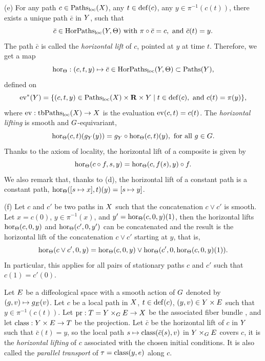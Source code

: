 \begin{article}
  (e) For any path $c \in \operatorname{Paths}_{\mathrm{loc}}(X)$,
  any $t \in \mathrm{def}(c)$,
  any $y \in \pi^{-1}(c(t))$,
  there exists a unique path $\bar c$ in $Y$,
  such that
  $$%
  \bar c \in \HorPaths_\loc(\Y, \Theta)\text{ with } \pi \circ \bar c = c, \text{ and } \bar c(t) = y.
  $$%
  The path $\bar c$ is called the {\em horizontal lift} of $c$,
  pointed at $y$ at time $t$.
  Therefore, we get a map
  \begin{equation}
    \renewcommand{\theequation}{$\clubsuit$}
    \hor_\Theta : (c,t,y) \mapsto \bar c \in \HorPaths_\loc(\Y,\Theta) \subset \Paths(\Y),
  \end{equation}
  defined on
  $$%
  \ev^*(\Y) = \{ (c,t,y) \in \Paths_\loc(\X) \times \RR \times \Y \mid t \in \Dom(c), \text{ and } c(t) = \pi(y) \},
  $$%
  where ${\operatorname{ev}} : \operatorname{tbPaths}_{\mathrm{loc}}(X) \to X$ is the evaluation ${\operatorname{ev}}(c,t) = c(t)$.
  The {\em horizontal lifting} is smooth and $G$-equivariant,
  $$%
  \hor_\Theta(c,t)(g_\Y(y)) = g_\Y \circ \hor_\Theta(c,t)(y), \text{ for all } g \in \G.
  $$%
  Thanks to the axiom of locality,
  the horizontal lift of a composite is given by
  $$%
  \hor_\Theta(c \circ f, s, y) = \hor_\Theta(c, f(s),y)\circ f.
  $$%
  We also remark that,
  thanks to (d),
  the horizontal lift of a constant path is a constant path,
  $\operatorname{hor}_\Theta([s \mapsto x],t)(y) = [s \mapsto y]$.
  
  (f) Let $c$ and $c'$ be two paths in $X$ such that the concatenation $c\vee c'$  is smooth.
  Let $x = c(0)$,
  $y \in \pi^{-1}(x)$,
  and $y' = \operatorname{hor}_\Theta(c,0,y)(1)$,
  then the horizontal lifts $\operatorname{hor}_\Theta(c,0,y)$ and $\operatorname{hor}_\Theta(c',0,y')$ can be concatenated and the result is the horizontal lift of the concatenation $c \vee c'$ starting at $y$,
  that is,
  $$%
  \hor_\Theta(c \vee c',0,y) =  \hor_\Theta(c,0,y) \vee \hor_\Theta(c',0, \hor_\Theta(c,0,y)(1)).
  $$%
  In particular, this applies for all pairs of stationary paths $c$ and $c'$  such
  that $c(1) = c'(0)$.
  
   Let $E$ be a diffeological space with a smooth action of $G$ denoted by $(g,v) \mapsto g_E(v)$.
  Let $c$ be a local path in $X$, $t \in \mathrm{def}(c)$,
  $(y,v) \in Y \times E$ such that $y \in \pi^{-1}(c(t))$.
  Let $\mathrm{pr} : T = Y \times_G E \to X$ be the associated fiber bundle ,
  and let $\operatorname{class} : Y \times E \to T$ be the projection.
  Let $\bar c$ be the horizontal lift of $c$ in $Y$ such that $\bar c(t) = y$,
  so the local path $s \mapsto \operatorname{class}(\bar c(s),v)$ in $Y \times_G E$ covers $c$,
  it is the {\em horizontal lifting} of $c$ associated with the chosen initial conditions.
  It is also called the {\em parallel transport} of $\tau = \operatorname{class}(y,e)$ along $c$.
  

\end{article}
